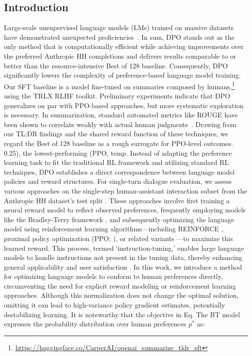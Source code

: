 \begin{lemma}
\section{Introduction}
Large-scale unsupervised language models (LMs) trained on massive datasets have demonstrated unexpected proficiencies~\citep{chowdhery2022palm, brown2020language, touvron2023llama,bubeck2023sparks}. In sum, DPO stands out as the only method that is computationally efficient while achieving improvements over the preferred Anthropic HH completions and delivers results comparable to or better than the resource-intensive Best of 128 baseline. Consequently, DPO significantly lowers the complexity of preference-based language model training. Our SFT baseline is a model fine-tuned on summaries composed by humans,\footnote{\url{https://huggingface.co/CarperAI/openai_summarize_tldr_sft}} using the TRLX \citep{leandro_von_werra_2023_7790115} RLHF toolkit. Preliminary experiments indicate that DPO generalizes on par with PPO-based approaches, but more systematic exploration is necessary. In summarization, standard automated metrics like ROUGE have been shown to correlate weakly with actual human judgments~\citep{stiennon2022learning}. Drawing from our TL;DR findings and the shared reward function of these techniques, we regard the Best of 128 baseline as a rough surrogate for PPO-level outcomes. 0.25), the lowest-performing (PPO, temp. Instead of adapting the preference learning task to fit the traditional RL framework and utilizing standard RL techniques, DPO establishes a direct correspondence between language model policies and reward structures. For single-turn dialogue evaluation, we assess various approaches on the single-step human-assistant interaction subset from the Anthropic HH dataset’s test split \citep{bai2022training}. These approaches involve first training a neural reward model to reflect observed preferences, frequently employing models like the Bradley-Terry framework \citep{bradley1952rankanalysis}, and subsequently optimizing the language model using reinforcement learning algorithms—including REINFORCE \citep{williams1992reinforce}, proximal policy optimization (PPO; \cite{schulman2017proximal}), or related variants \citep{ramamurthy2023is}—to maximize this learned reward. This process, termed `instruction-tuning,' enables large language models to handle instructions not present in the tuning data, thereby enhancing general applicability and user satisfaction \citep{chung2022scaling}. In this work, we introduce a method for optimizing language models to conform to human preferences directly, circumventing the need for explicit reward modeling or reinforcement learning approaches. Although this normalization does not change the optimal solution, omitting it can lead to high-variance policy gradient estimates, potentially destabilizing learning. It is noteworthy that the objective in Eq. The BT model expresses the probability distribution over human preferences $p^*$ as:


\end{lemma}

